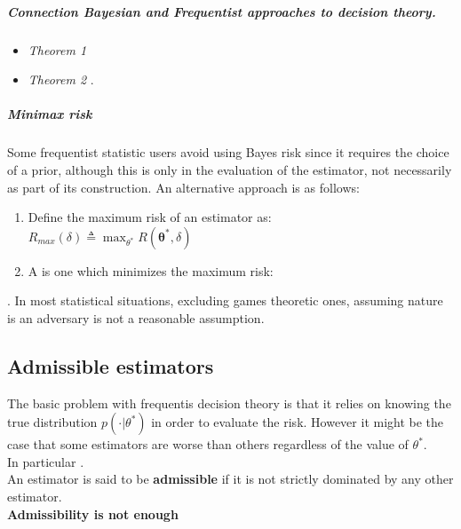 \subparagraph{Connection Bayesian and Frequentist approaches to decision theory.}
\begin{itemize}
    \item \emph{Theorem 1} 
    \item \emph{Theorem 2} .
\end{itemize}

\subparagraph{Minimax risk}
Some frequentist statistic users avoid using Bayes risk since it requires the choice of
a prior, although this is only in the evaluation of the estimator, not necessarily as 
part of its construction. An alternative approach is as follows:
\begin{enumerate}
    \item Define the  maximum risk of an estimator as:\\
        $R_{max}(\delta) \triangleq \displaystyle\max_{\theta^{*}}R(\bm{\theta}^{*},
        \delta)$
    \item A  is one which minimizes the maximum risk:
\end{enumerate}
.
In most statistical situations, excluding games theoretic ones, assuming nature is an
adversary is not a reasonable assumption.


\subsection{Admissible estimators}
The basic problem with frequentis decision theory is that it relies on knowing the true
distribution $p(\cdot|\theta^{*})$ in order to evaluate the risk. However it might be 
the case that some estimators are worse than others regardless of the value of 
$\theta^{*}$.\\
In particular .\\
An estimator is said to be \textbf{admissible} if it is not strictly dominated by any 
other estimator.\\
\textbf{Admissibility is not enough}
